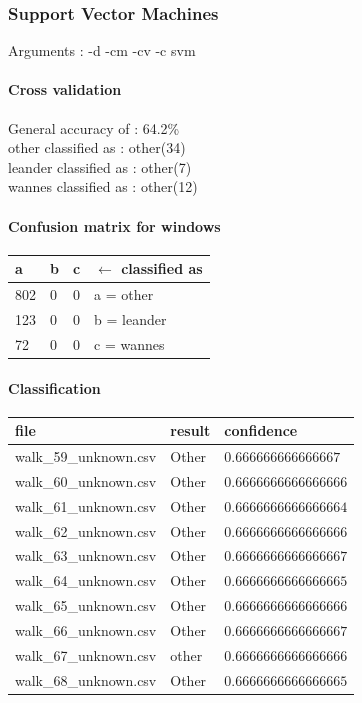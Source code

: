 \subsubsection{Support Vector Machines}
Arguments : -d -cm -cv -c svm 
\paragraph{Cross validation}
General accuracy of : 64.2\%\\
other classified as : other(34) \\
leander classified as : other(7) \\
wannes classified as : other(12)

\paragraph{Confusion matrix for windows}

\begin{tabular}{l l l | l}
    a &    b &   c & $\leftarrow$ classified as \\
    \hline
   802 & 0 & 0 &    a = other \\
   123 & 0 & 0 &    b = leander \\
    72 & 0 & 0 &    c = wannes
\end{tabular}

\paragraph{Classification}
\begin{tabular}{l | l | l}
    file & result & confidence\\ 
    \hline 
    walk\_59\_unknown.csv & Other   & $0.666666666666667$ \\
    walk\_60\_unknown.csv & Other   & $0.6666666666666666$ \\
    walk\_61\_unknown.csv & Other   & $0.6666666666666664$ \\
    walk\_62\_unknown.csv & Other   & $0.6666666666666666$ \\
    walk\_63\_unknown.csv & Other   & $0.6666666666666667$ \\
    walk\_64\_unknown.csv & Other   & $0.6666666666666665$ \\
    walk\_65\_unknown.csv & Other   & $0.6666666666666666$ \\
    walk\_66\_unknown.csv & Other   & $0.6666666666666667$ \\
    walk\_67\_unknown.csv & other   & $0.6666666666666666$ \\
    walk\_68\_unknown.csv & Other   & $0.6666666666666665$
\end{tabular}

